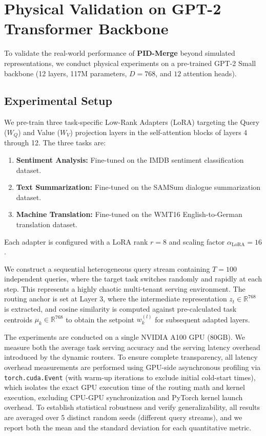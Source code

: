\section{Physical Validation on GPT-2 Transformer Backbone}
\label{sec:appendix_gpt2}

To validate the real-world performance of \textbf{PID-Merge} beyond simulated representations, we conduct physical experiments on a pre-trained GPT-2 Small backbone (12 layers, 117M parameters, $D = 768$, and $12$ attention heads).

\subsection{Experimental Setup}
We pre-train three task-specific Low-Rank Adapters (LoRA) targeting the Query ($W_Q$) and Value ($W_V$) projection layers in the self-attention blocks of layers 4 through 12. The three tasks are:
\begin{enumerate}
    \item \textbf{Sentiment Analysis:} Fine-tuned on the IMDB sentiment classification dataset.
    \item \textbf{Text Summarization:} Fine-tuned on the SAMSum dialogue summarization dataset.
    \item \textbf{Machine Translation:} Fine-tuned on the WMT16 English-to-German translation dataset.
\end{enumerate}
Each adapter is configured with a LoRA rank $r = 8$ and scaling factor $\alpha_{\text{LoRA}} = 16$. 

We construct a sequential heterogeneous query stream containing $T = 100$ independent queries, where the target task switches randomly and rapidly at each step. This represents a highly chaotic multi-tenant serving environment. The routing anchor is set at Layer 3, where the intermediate representation $z_t \in \mathbb{R}^{768}$ is extracted, and cosine similarity is computed against pre-calculated task centroids $\mu_k \in \mathbb{R}^{768}$ to obtain the setpoint $w_k^{(l)}$ for subsequent adapted layers.

The experiments are conducted on a single NVIDIA A100 GPU (80GB). We measure both the average task serving accuracy and the serving latency overhead introduced by the dynamic routers. To ensure complete transparency, all latency overhead measurements are performed using GPU-side asynchronous profiling via \texttt{torch.cuda.Event} (with warm-up iterations to exclude initial cold-start times), which isolates the exact GPU execution time of the routing math and kernel execution, excluding CPU-GPU synchronization and PyTorch kernel launch overhead. To establish statistical robustness and verify generalizability, all results are averaged over 5 distinct random seeds (different query streams), and we report both the mean and the standard deviation for each quantitative metric.

